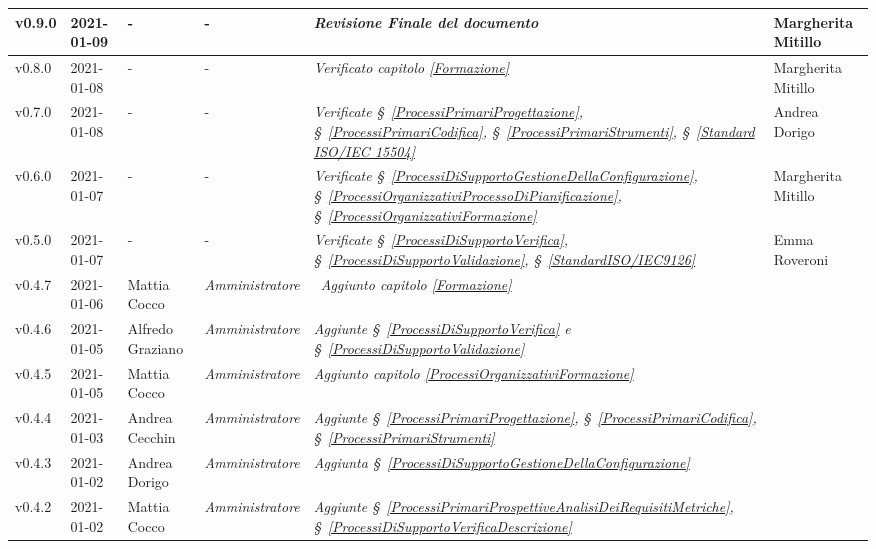 {\begin{center}
\begin{longtable}[c]{|p{2cm-1\tabcolsep}|p{2cm}|p{3cm-2\tabcolsep}|p{3cm-1.5\tabcolsep}|p{}|p{3cm-2\tabcolsep}|}
		\hline
		\centering v0.9.0 & 2021-01-09 & \centering - & \centering -  & \textit{Revisione Finale del documento} & Margherita Mitillo\\
		\hline
		\centering v0.8.0 & 2021-01-08 & \centering - & \centering -  & \textit{Verificato capitolo \ref{Formazione}} & Margherita Mitillo \\
		\hline
		\centering v0.7.0 & 2021-01-08 & \centering - & \centering -  & \textit{Verificate  \S~\ref{ProcessiPrimariProgettazione}, \S~\ref{ProcessiPrimariCodifica}, \S~\ref{ProcessiPrimariStrumenti}, \S~\ref{Standard ISO/IEC 15504} } & Andrea Dorigo \\
		\hline
		\centering v0.6.0 & 2021-01-07 & \centering - & \centering -  & \textit{Verificate  \S~\ref{ProcessiDiSupportoGestioneDellaConfigurazione}, \S~\ref{ProcessiOrganizzativiProcessoDiPianificazione}, \S~\ref{ProcessiOrganizzativiFormazione}} & Margherita Mitillo \\
		\hline
		\centering v0.5.0 & 2021-01-07 & \centering - & \centering -  & \textit{Verificate \S~\ref{ProcessiDiSupportoVerifica}, \S~\ref{ProcessiDiSupportoValidazione}, \S~\ref{StandardISO/IEC9126}} & Emma Roveroni \\
		\hline
		\centering v0.4.7 & 2021-01-06 & Mattia Cocco & \centering \textit{Amministratore}  & \	\textit{Aggiunto capitolo \ref{Formazione}} & \makecell[c]{-} \\
		\hline
		\centering v0.4.6 & 2021-01-05 & Alfredo Graziano & \centering \textit{Amministratore} &  \textit{Aggiunte  \S~\ref{ProcessiDiSupportoVerifica} e \S~\ref{ProcessiDiSupportoValidazione} } & \makecell[c]{-} \\
		\hline
		\centering v0.4.5 & 2021-01-05 & Mattia Cocco & \centering \textit{Amministratore}  & \textit{Aggiunto capitolo \ref{ProcessiOrganizzativiFormazione}}  & \makecell[c]{-}\\
		\hline
		\centering v0.4.4 & 2021-01-03 & Andrea Cecchin & \centering \textit{Amministratore} &  \textit{Aggiunte  \S~\ref{ProcessiPrimariProgettazione}, \S~\ref{ProcessiPrimariCodifica}, \S~\ref{ProcessiPrimariStrumenti}}  & \makecell[c]{-}\\
		\hline
		\centering v0.4.3 & 2021-01-02 & Andrea Dorigo & \centering \textit{Amministratore}  & \textit{Aggiunta  \S~\ref{ProcessiDiSupportoGestioneDellaConfigurazione}} & \makecell[c]{-}\\
		\hline
		\centering v0.4.2 & 2021-01-02 & Mattia Cocco & \centering \textit{Amministratore}  & \textit{Aggiunte  \S~\ref{ProcessiPrimariProspettiveAnalisiDeiRequisitiMetriche}, \S~\ref{ProcessiDiSupportoVerificaDescrizione}}  & \makecell[c]{-}\\

\end{longtable}
\end{center}}
